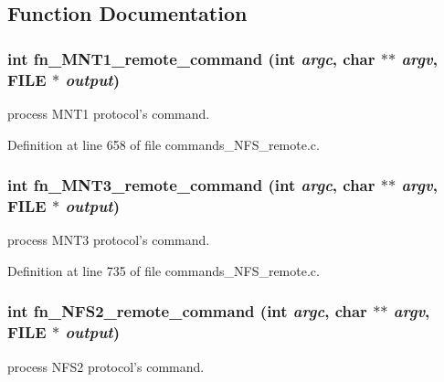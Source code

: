 \subsection{Function Documentation}
\subsubsection[{fn\_\-MNT1\_\-remote\_\-command}]{\setlength{\rightskip}{0pt plus 5cm}int fn\_\-MNT1\_\-remote\_\-command (int {\em argc}, \/  char $\ast$$\ast$ {\em argv}, \/  FILE $\ast$ {\em output})}\label{commands__NFS__remote_8c_a1677ca6949081f0d97593268114459a1}
process MNT1 protocol's command. 

Definition at line 658 of file commands\_\-NFS\_\-remote.c.
\subsubsection[{fn\_\-MNT3\_\-remote\_\-command}]{\setlength{\rightskip}{0pt plus 5cm}int fn\_\-MNT3\_\-remote\_\-command (int {\em argc}, \/  char $\ast$$\ast$ {\em argv}, \/  FILE $\ast$ {\em output})}\label{commands__NFS__remote_8c_a7d8f2c4570bef1373bc94247b00a753e}
process MNT3 protocol's command. 

Definition at line 735 of file commands\_\-NFS\_\-remote.c.
\subsubsection[{fn\_\-NFS2\_\-remote\_\-command}]{\setlength{\rightskip}{0pt plus 5cm}int fn\_\-NFS2\_\-remote\_\-command (int {\em argc}, \/  char $\ast$$\ast$ {\em argv}, \/  FILE $\ast$ {\em output})}\label{commands__NFS__remote_8c_a53ac76af43fede3f2e559a1b4fbb136f}
process NFS2 protocol's command. 


